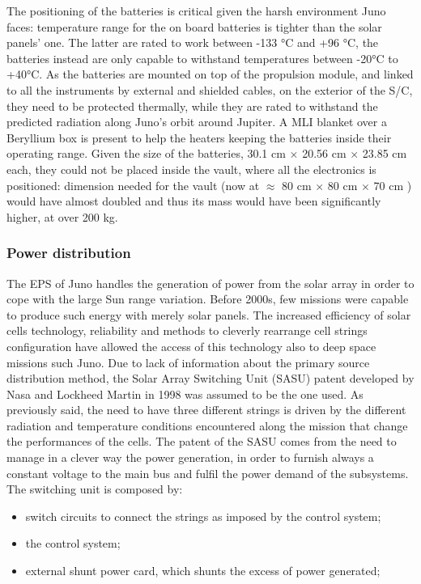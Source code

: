 The positioning of the batteries is critical given the harsh environment Juno faces: temperature range for the on board batteries is tighter than the solar panels' one. The latter are rated to work between -133 °C and +96 °C, the batteries instead are only capable to withstand temperatures between -20°C to +40°C. As the batteries are mounted on top of the propulsion module, and linked to all the instruments by external and shielded cables, on the exterior of the S/C, they need to be protected thermally, while they are rated to withstand the predicted radiation along Juno's orbit around Jupiter\cite{batteries_position}. A MLI blanket over a Beryllium box is present to help the heaters keeping the batteries inside their operating range. Given the size of the batteries, 30.1 cm $\times$ 20.56 cm $\times$ 23.85 cm each, they could not be placed inside the vault, where all the electronics is positioned: dimension needed for the vault (now at  $\approx$ 80 cm $\times$ 80 cm $\times$ 70 cm ) would have almost doubled and thus its mass would have been significantly higher, at over 200 kg.\cite{batteries_position}

\subsubsection{Power distribution}
\label{subsec: pwr_distribution}

The EPS of Juno handles the generation of power from the solar array  in order to cope with the large Sun range variation. Before 2000s, few missions were capable to produce such energy with merely solar panels. The increased efficiency of solar cells technology, reliability and methods to cleverly rearrange cell strings configuration have allowed the access of this technology also to deep space missions such Juno. 
Due to lack of information about the primary source distribution method, the Solar Array Switching Unit (SASU) patent developed by Nasa and Lockheed Martin in 1998 was assumed to be the one used. \mref 
As previously said, the need to have three different strings is driven by the different radiation and temperature conditions encountered along the mission that change the performances of the cells. The patent of the SASU comes from the need to manage in a clever way the power generation, in order to furnish always a constant voltage to the main bus and fulfil the power demand of the subsystems. The switching unit is composed by:
\begin{itemize}
    \item switch circuits to connect the strings as imposed by the control system;
    \item the control system;
    \item external shunt power card, which shunts the excess of power generated;
\end{itemize}

